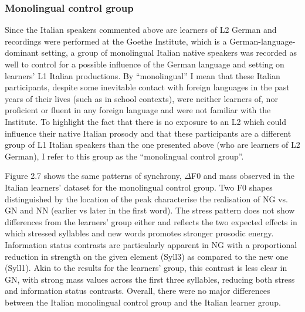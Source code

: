 \subsubsection[Monolingual control group]{Monolingual control group}
\hypertarget{Toc191305898}{}\begin{styleStandard}
Since the Italian speakers commented above are learners of L2 German and recordings were performed at the Goethe Institute, which is a German-language-dominant setting, a group of monolingual Italian native speakers was recorded as well to control for a possible influence of the German language and setting on learners’ L1 Italian productions. By “monolingual” I mean that these Italian participants, despite some inevitable contact with foreign languages in the past years of their lives (such as in school contexts), were neither learners of, nor proficient or fluent in any foreign language and were not familiar with the Institute. To highlight the fact that there is no exposure to an L2 which could influence their native Italian prosody and that these participants are a different group of L1 Italian speakers than the one presented above (who are learners of L2 German), I refer to this group as the “monolingual control group”.
\end{styleStandard}

\begin{styleStandard}
Figure 2.7 shows the same patterns of synchrony, ${\Delta}$F0 and mass observed in the Italian learners’ dataset for the monolingual control group. Two F0 shapes distinguished by the location of the peak characterise the realisation of NG vs. GN and NN (earlier vs later in the first word). The stress pattern does not show differences from the learners’ group either and reflects the two expected effects in which stressed syllables and new words promotes stronger prosodic energy. Information status contrasts are particularly apparent in NG with a proportional reduction in strength on the given element (Syll3) as compared to the new one (Syll1). Akin to the results for the learners’ group, this contrast is less clear in GN, with strong mass values across the first three syllables, reducing both stress and information status contrasts. Overall, there were no major differences between the Italian monolingual control group and the Italian learner group.
\end{styleStandard}

\begin{styleStandard}
  [Warning: Image ignored] %
 
\end{styleStandard}

